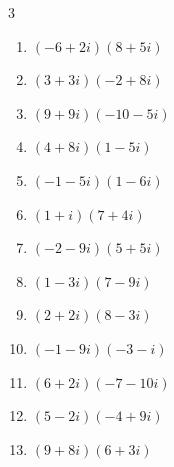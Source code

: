 \begin{multicols}{3}
\begin{enumerate}
        \phantom{$\displaystyle =-37+5i$}

  \item $\displaystyle (-6+2i)(8+5i)$

        \phantom{$\displaystyle =-58-14i$}

  \item $\displaystyle (3+3i)(-2+8i)$

        \phantom{$\displaystyle =-30+18i$}

  \item $\displaystyle (9+9i)(-10-5i)$

        \phantom{$\displaystyle =-45-135i$}

  \item $\displaystyle (4+8i)(1-5i)$

        \phantom{$\displaystyle =44-12i$}

  \item $\displaystyle (-1-5i)(1-6i)$

        \phantom{$\displaystyle =-31+i$}

  \item $\displaystyle (1+i)(7+4i)$

        \phantom{$\displaystyle =3+11i$}

  \item $\displaystyle (-2-9i)(5+5i)$

        \phantom{$\displaystyle =35-55i$}

  \item $\displaystyle (1-3i)(7-9i)$

        \phantom{$\displaystyle =-20-30i$}

  \item $\displaystyle (2+2i)(8-3i)$

        \phantom{$\displaystyle =22+10i$}

\columnbreak %

  \item $\displaystyle (-1-9i)(-3-i)$

        \phantom{$\displaystyle =-6+28i$}

  \item $\displaystyle (6+2i)(-7-10i)$

        \phantom{$\displaystyle =-22-74i$}

  \item $\displaystyle (5-2i)(-4+9i)$

        \phantom{$\displaystyle =-2+53i$}

  \item $\displaystyle (9+8i)(6+3i)$


\end{enumerate}
\end{multicols}
